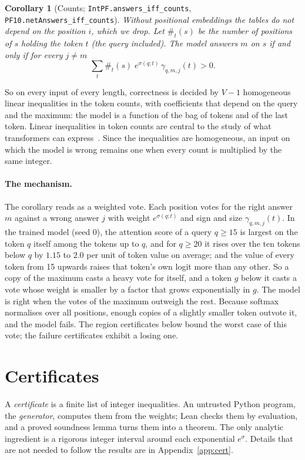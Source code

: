 \documentclass[11pt,a4paper]{article}
\newtheorem{corollary}[theorem]{Corollary}
\newcommand{\lean}[1]{\texttt{#1}}
\newcommand{\cnt}{\#}
\begin{document}
\begin{corollary}[Counts; \lean{IntPF.answers\_iff\_counts}, \lean{PF10.netAnswers\_iff\_counts}]\label{cor:counts}
Without positional embeddings the tables do not depend on the position $i$,
which we drop. Let $\cnt_t(s)$ be the number of positions of $s$ holding the
token $t$ (the query included). The model answers $m$ on $s$ if and only if for
every $j\ne m$
\[
 \sum_{t} \cnt_t(s)\; e^{\sigma(q;t)}\,\gamma_{q,m,j}(t)>0 .
\]
\end{corollary}

So on every input of every length, correctness is decided by $V-1$ homogeneous
linear inequalities in the token counts, with coefficients that depend on the
query and the maximum: the model is a function of the bag of tokens and of the
last token. Linear inequalities in token counts are central to the study of
what transformers can express~\cite{salzer2026counting}. Since the inequalities
are homogeneous, an input on which the model is wrong remains one when every
count is multiplied by the same integer.

\paragraph{The mechanism.}
The corollary reads as a weighted vote. Each position votes for the right answer
$m$ against a wrong answer $j$ with weight $e^{\sigma(q;t)}$ and sign and size
$\gamma_{q,m,j}(t)$. In the trained model (seed 0), the attention score of a
query $q\ge15$ is largest on the token $q$ itself among the tokens up to $q$,
and for $q\ge20$ it rises over the ten tokens below $q$ by $1.15$ to $2.0$ per
unit of token value on average; and the value of every token from 15 upwards raises that
token's own logit more than any other. So a copy of the maximum casts a heavy
vote for itself, and a token $g$ below it casts a vote whose weight is smaller
by a factor that grows exponentially in $g$. The model is right when the votes
of the maximum outweigh the rest. Because softmax normalises over all
positions, enough copies of a slightly smaller token outvote it, and the model
fails. The region certificates below bound the worst case of this vote; the
failure certificates exhibit a losing one.

\section{Certificates}\label{sec:cert}

A \emph{certificate} is a finite list of integer inequalities. An untrusted
Python program, the \emph{generator}, computes them from the weights; Lean
checks them by evaluation, and a proved soundness lemma turns them into a
theorem. The only analytic ingredient is a rigorous integer interval around
each exponential $e^{\sigma}$. Details that are not needed to follow the results
are in Appendix~\ref{app:cert}.
\end{document}
